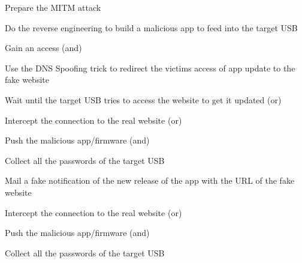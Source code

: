 \begin{myEnumerate}
\begin{myEnumerate}[label*=\arabic*.]
\begin{myEnumerate}[label*=\arabic*.]
    \item Prepare the MITM attack
      \begin{myEnumerate}[label*=\arabic*.]
      \item Do the reverse engineering to build a malicious app to feed into the
        target USB
      \end{myEnumerate}
    \end{myEnumerate}
  \item Gain an access (and)
    \begin{myEnumerate}[label*=\arabic*.]
    \item Use the DNS Spoofing trick to redirect the victims access of app
      update to the fake website
      \begin{myEnumerate}[label*=\arabic*.]
      \item Wait until the target USB tries to access the website to get it updated (or)
        \begin{myEnumerate}[label*=\arabic*.]
        \item Intercept the connection to the real website (or)
          \begin{myEnumerate}[label*=\arabic*.]
          \item Push the malicious app/firmware (and)
            \begin{myEnumerate}[label*=\arabic*.]
            \item Collect all the passwords of the target USB
            \end{myEnumerate}
          \end{myEnumerate}
        \end{myEnumerate}
      \item Mail a fake notification of the new release of the app with the URL of
        the fake website
        \begin{myEnumerate}[label*=\arabic*.]
        \item Intercept the connection to the real website (or)
          \begin{myEnumerate}[label*=\arabic*.]
          \item Push the malicious app/firmware (and)
            \begin{myEnumerate}[label*=\arabic*.]
            \item Collect all the passwords of the target USB
            \end{myEnumerate}
          \end{myEnumerate}
        \end{myEnumerate}

\end{myEnumerate}
\end{myEnumerate}
\end{myEnumerate}
\end{myEnumerate}
